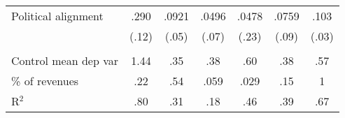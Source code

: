 {{\begin{tabular}{lcccccc}
Political alignment 
                    &        .290\sym{**} &       .0921\sym{*}  &       .0496         &       .0478         &       .0759         &        .103\sym{***}\\
                    &       (.12)         &       (.05)         &       (.07)         &       (.23)         &       (.09)         &       (.03)         \\
\\
Control mean dep var 	
				    &        1.44         &         .35         &         .38         &         .60         &         .38         &         .57         \\

\% of revenues    	
				    &         .22         &         .54         &        .059         &        .029         &         .15         &           1         \\
R$^2$          		
					&         .80         &         .31         &         .18         &         .46         &         .39         &         .67         \\

\bottomrule							




\end{tabular}
}
}